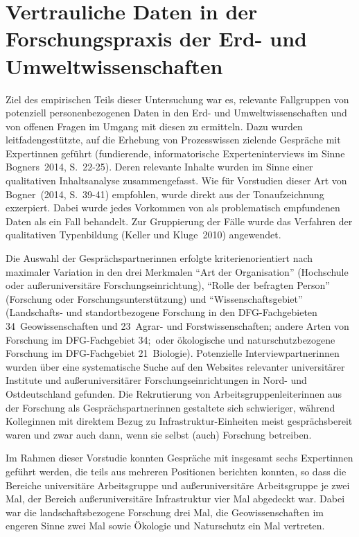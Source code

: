 \documentclass[a4paper,
fontsize=11pt,
oneside,
numbers=noperiodatend,
parskip=half-,
bibliography=totoc,
final
]{scrartcl}
\begin{document}
\hypertarget{vertrauliche-daten-in-der-forschungspraxis-der-erd--und-umweltwissenschaften}{%
\section{Vertrauliche Daten in der Forschungspraxis der Erd- und
Umweltwissenschaften}\label{vertrauliche-daten-in-der-forschungspraxis-der-erd--und-umweltwissenschaften}}

Ziel des empirischen Teils dieser Untersuchung war es, relevante
Fallgruppen von potenziell personenbezogenen Daten in den Erd- und
Umweltwissenschaften und von offenen Fragen im Umgang mit diesen zu
ermitteln. Dazu wurden leitfadengestützte, auf die Erhebung von
Prozesswissen zielende Gespräche mit Expertinnen geführt (fundierende,
informatorische Experteninterviews im Sinne Bogners~2014, S.~22-25).
Deren relevante Inhalte wurden im Sinne einer qualitativen
Inhaltsanalyse zusammengefasst. Wie für Vorstudien dieser Art von
Bogner~(2014, S.~39-41) empfohlen, wurde direkt aus der Tonaufzeichnung
exzerpiert. Dabei wurde jedes Vorkommen von als problematisch
empfundenen Daten als ein Fall behandelt. Zur Gruppierung der Fälle
wurde das Verfahren der qualitativen Typenbildung (Keller und
Kluge~2010) angewendet.

Die Auswahl der Gesprächspartnerinnen erfolgte kriterienorientiert nach
maximaler Variation in den drei Merkmalen \enquote{Art der Organisation}
(Hochschule oder außeruniversitäre Forschungseinrichtung),
\enquote{Rolle der befragten Person} (Forschung oder
Forschungsunterstützung) und \enquote{Wissenschaftsgebiet} (Landschafts-
und standortbezogene Forschung in den DFG-Fachge\-bieten
34~Geowissenschaften und 23~Agrar- und Forstwissenschaften; andere Arten
von Forschung im DFG-Fachgebiet 34;~oder ökologische und
naturschutzbezogene Forschung im DFG-Fachgebiet 21~Biologie).
Potenzielle Interviewpartnerinnen wurden über eine systematische Suche
auf den Websites relevanter universitärer Institute und
außeruniversitärer Forschungseinrichtungen in Nord- und Ostdeutschland
gefunden. Die Rekrutierung von Arbeitsgruppenleiterinnen aus der
Forschung als Gesprächspartnerinnen gestaltete sich schwieriger, während
Kolleginnen mit direktem Bezug zu Infrastruktur-Einheiten meist
gesprächsbereit waren und zwar auch dann, wenn sie selbst (auch)
Forschung betreiben.

Im Rahmen dieser Vorstudie konnten Gespräche mit insgesamt sechs
Expertinnen geführt werden, die teils aus mehreren Positionen berichten
konnten, so dass die Bereiche universitäre Arbeitsgruppe und
außeruniversitäre Arbeitsgruppe je zwei Mal, der Bereich
außeruniversitäre Infrastruktur vier Mal abgedeckt war. Dabei war die
landschaftsbezogene Forschung drei Mal, die Geowissenschaften im engeren
Sinne zwei Mal sowie Ökologie und Naturschutz ein Mal vertreten.
\end{document}
